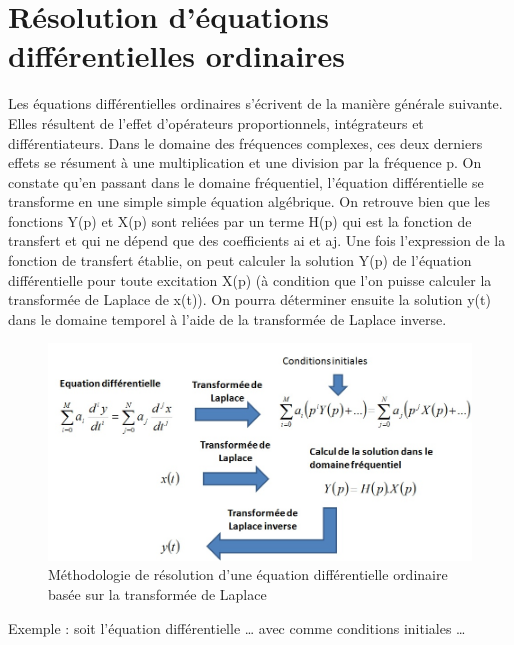 \documentclass[]{book}
\begin{document}
{	\section{Résolution d'équations différentielles ordinaires}
	Les équations différentielles ordinaires s'écrivent de la manière générale suivante. Elles résultent de l'effet d'opérateurs proportionnels, intégrateurs et différentiateurs. Dans le domaine des fréquences complexes, ces deux derniers effets se résument à une multiplication et une division par la fréquence p. On constate qu'en passant dans le domaine fréquentiel, l'équation différentielle se transforme en une simple simple équation algébrique. On retrouve bien que les fonctions Y(p) et X(p) sont reliées par un terme H(p) qui est la fonction de transfert et qui ne dépend que des coefficients ai et aj. Une fois l'expression de la fonction de transfert établie, on peut calculer la solution Y(p) de l'équation différentielle pour toute excitation X(p) (à condition que l'on puisse calculer la transformée de Laplace de x(t)). On pourra déterminer ensuite la solution y(t) dans le domaine temporel à l'aide de la transformée de Laplace inverse.
	\begin{figure}[h!]
		\centering
		\includegraphics[scale=0.6]{images/Methodo_reso_equa_diff_Laplace.jpg}
		\caption{Méthodologie de résolution d'une équation différentielle ordinaire basée sur la transformée de Laplace}	
		\label{Fig:Methodo_reso_equa_diff_Laplace} 
	\end{figure}
	Exemple : soit l'équation différentielle … avec comme conditions initiales …
	
}
\end{document}
